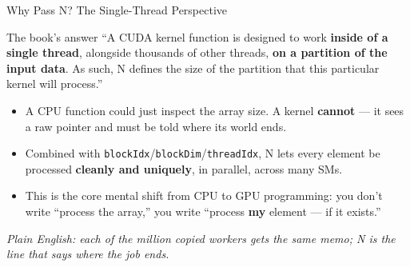 \documentclass[aspectratio=169]{beamer}
\newcommand{\kw}[1]{\textbf{\textcolor{kwblue}{#1}}}
\newcommand{\pe}[1]{\par{\setlength{\fboxsep}{2.5pt}\noindent\colorbox{navy!9}{\parbox{\dimexpr\textwidth-5pt\relax}{\footnotesize\itshape Plain English: #1}}}}
\begin{document}
\begin{frame}{Why Pass N? The Single-Thread Perspective}
  \begin{block}{The book's answer}
    ``A CUDA kernel function is designed to work \kw{inside of a single thread}, alongside thousands
    of other threads, \kw{on a partition of the input data}. As such, N defines the size of the
    partition that this particular kernel will process.''
  \end{block}
  \begin{itemize}
    \item A CPU function could just inspect the array size. A kernel \kw{cannot} ---
          it sees a raw pointer and must be told where its world ends.
    \item Combined with \texttt{blockIdx}/\texttt{blockDim}/\texttt{threadIdx}, N lets every
          element be processed \kw{cleanly and uniquely}, in parallel, across many SMs.
    \item This is the core mental shift from CPU to GPU programming: you don't write
          ``process the array,'' you write ``process \kw{my} element --- if it exists.''
  \end{itemize}
  \pe{each of the million copied workers gets the same memo; N is the line that says where the job ends.}
\end{frame}
\end{document}
